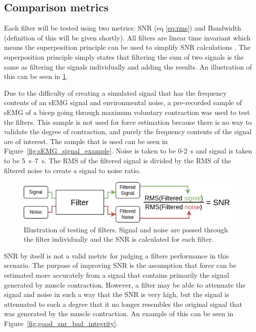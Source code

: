 \subsection{Comparison metrics}
Each filter will be tested using two metrics: SNR (eq \ref{eq:rms}) and Bandwidth (definition of this will be given shortly). All filters are linear time invariant which means the superposition principle can be used to simplify SNR calculations \cite{linear_systems_theory}. The superposition principle simply states that filtering the sum of two signals is the same as filtering the signals individually and adding the results. An illustration of this can be seen in \ref{fig:filter_process}. 

Due to the difficulty of creating a simulated signal that has the frequency contents of an sEMG signal and environmental noise, a pre-recorded sample of sEMG of a bicep going through maximum voluntary contraction was used to test the filters. This sample is not used for force estimation because there is no way to validate the degree of contraction, and purely the frequency contents of the signal are of interest. The sample that is used can be seen in Figure~\ref{fig:sEMG_signal_example}. Noise is taken to be 0-\SI{2}{\second} and signal is taken to be \SIrange{5}{7}{\second}. The RMS of the filtered signal is divided by the RMS of the filtered noise to create a signal to noise ratio.

\begin{figure}[h!t]
	\begin{center}
		\includegraphics[width=1.0\columnwidth]{images/filter_process.png}
	\end{center}
	\caption{Illustration of testing of filters. Signal and noise are passed through the filter individually and the SNR is calculated for each filter.}
	\label{fig:filter_process}
\end{figure}

SNR by itself is not a valid metric for judging a filters performance in this scenario. The purpose of improving SNR is the assumption that force can be estimated more accurately from a signal that contains primarily the signal generated by muscle contraction. However, a filter may be able to attenuate the signal and noise in such a way that the SNR is very high, but the signal is attenuated to such a degree that it no longer resembles the original signal that was generated by the muscle contraction. An example of this can be seen in Figure~\ref{fig:good_snr_bad_integrity}. 

